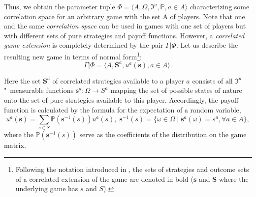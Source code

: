 Thus, we obtain the parameter tuple $\Phi = \langle A, \Omega, \mathfrak{I}^a, \mathbb{P}, a \in A \rangle$ characterizing some correlation space for an arbitrary game with the set A of players. Note that one and the same \emph{correlation space} can be used in games with one set of players but with different sets of pure strategies and payoff functions. However, a \emph{correlated game extension} is completely determined by the pair $\Gamma | \Phi$. Let us describe the resulting new game in terms of normal form\footnote{Following the notation introduced in \cite{Aumann74}, the sets of strategies and outcome sets of a correlated extension of the game are denoted in bold ($\mathbf{s}$ and $\mathbf{S}$ where the underlying game has $s$ and $S$).}: %
\begin{equation*}
	\Gamma | \Phi = \langle A, \mathbf{S}^a, u^a(\mathbf{s}), a \in A \rangle.
\end{equation*}

Here the set $\mathbf{S}^a$ of correlated strategies available to a player $a$ consists of all $\mathfrak{I}^a$"~measurable functions $\mathbf{s}^a : \Omega \rightarrow S^a$ mapping the set of possible states of nature onto the set of pure strategies available to this player. Accordingly, the payoff function is calculated by the formula for the expectation of a random variable, %
\begin{equation*}
	u^a(\mathbf{s}) = \sum\limits_{s \in S} \mathbb{P}(\mathbf{s}^{-1}(s)) u^a(s),\;\mathbf{s}^{-1}(s) = \{\omega \in \Omega \mid \mathbf{s}^a(\omega) = s^a, \forall a \in A\},
\end{equation*}
where the $\mathbb{P}(\mathbf{s}^{-1}(s))$ serve as the coefficients of the distribution on the game matrix. %

